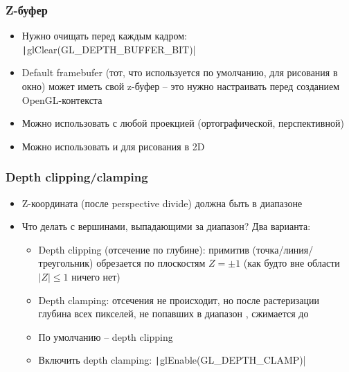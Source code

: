 \documentclass[10pt]{beamer}
\begin{document}
\begin{frame}[fragile]
\frametitle{Z-буфер}
\begin{itemize}
\item Нужно очищать перед каждым кадром: \texttt|glClear(GL_DEPTH_BUFFER_BIT)|
\pause
\item Default framebufer (тот, что используется по умолчанию, для рисования в окно) может иметь свой z-буфер -- это нужно настраивать перед созданием OpenGL-контекста
\pause
\item Можно использовать с любой проекцией (ортографической, перспективной)
\item Можно использовать и для рисования в 2D
\end{itemize}
\end{frame}

\begin{frame}[fragile]
\frametitle{Depth clipping/clamping}
\begin{itemize}
\item Z-координата (после perspective divide) должна быть в диапазоне \begin{math}[-1, 1]\end{math}
\pause
\item Что делать с вершинами, выпадающими за диапазон? Два варианта:
\pause
\begin{itemize}
\item Depth clipping (отсечение по глубине): примитив (точка/линия/треугольник) обрезается по плоскостям \begin{math}Z = \pm 1\end{math} (как будто вне области \begin{math}|Z|\leq 1\end{math} ничего нет)
\pause
\item Depth clamping: отсечения не происходит, но после растеризации глубина всех пикселей, не попавших в диапазон \begin{math}[-1, 1]\end{math}, сжимается до \begin{math}[-1, 1]\end{math}
\pause
\item По умолчанию -- depth clipping
\item Включить depth clamping: \texttt|glEnable(GL_DEPTH_CLAMP)|
\end{itemize}
\end{itemize}
\end{frame}
\end{document}
